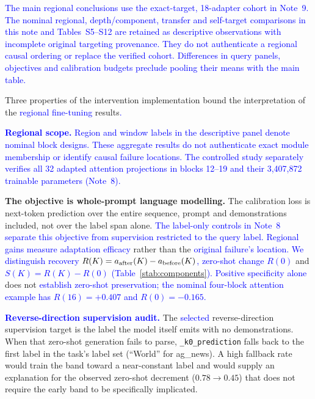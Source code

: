 \documentclass[11pt]{article}
\begin{document}
\textcolor{blue}{The main regional conclusions use the exact-target, 18-adapter cohort in Note~9. The nominal regional, depth/component, transfer and self-target comparisons in this note and Tables~S5--S12 are retained as descriptive observations with incomplete original targeting provenance. They do not authenticate a regional causal ordering or replace the verified cohort. Differences in query panels, objectives and calibration budgets preclude pooling their means with the main table.}

Three properties of the intervention implementation bound the interpretation of the
\textcolor{blue}{regional fine-tuning} results\textcolor{blue}{.}

\textbf{\textcolor{blue}{Regional scope.}} \textcolor{blue}{Region and window labels in the descriptive
panel denote nominal block designs. These aggregate results do not authenticate exact
module membership or identify causal failure locations. The controlled study separately
verifies all 32 adapted attention projections in blocks 12--19 and their 3,407,872
trainable parameters (Note~8).}

\textbf{The objective is whole-prompt language modelling.} The calibration loss is
next-token prediction over the entire sequence, prompt and demonstrations included, not
over the label span alone. \textcolor{blue}{The label-only controls in Note~8 separate this objective
from supervision restricted to the query label. Regional gains measure adaptation
efficacy} rather than the \textcolor{blue}{original failure's location. We distinguish recovery
$R(K)=a_{\rm after}(K)-a_{\rm before}(K)$, zero-shot change $R(0)$} and
\textcolor{blue}{$S(K)=R(K)-R(0)$ (Table}~\textcolor{blue}{\ref{stab:components}}\textcolor{blue}{). Positive specificity alone} does not \textcolor{blue}{establish
zero-shot preservation; the nominal four-block attention example has $R(16)=+0.407$
and $R(0)=-0.165$.}

\textbf{\textcolor{blue}{Reverse-direction supervision audit.}} The \textcolor{blue}{selected}
reverse-direction supervision target is the label the model itself emits with no demonstrations.
When that zero-shot generation fails to parse, \texttt{\_k0\_prediction} falls back to the
first label in the task's label set (``World'' for ag\_news). A high fallback rate would
train the band toward a near-constant label and would supply an explanation for the observed
zero-shot decrement ($0.78\rightarrow0.45$) that does not require the early band to be
specifically implicated.
\end{document}
